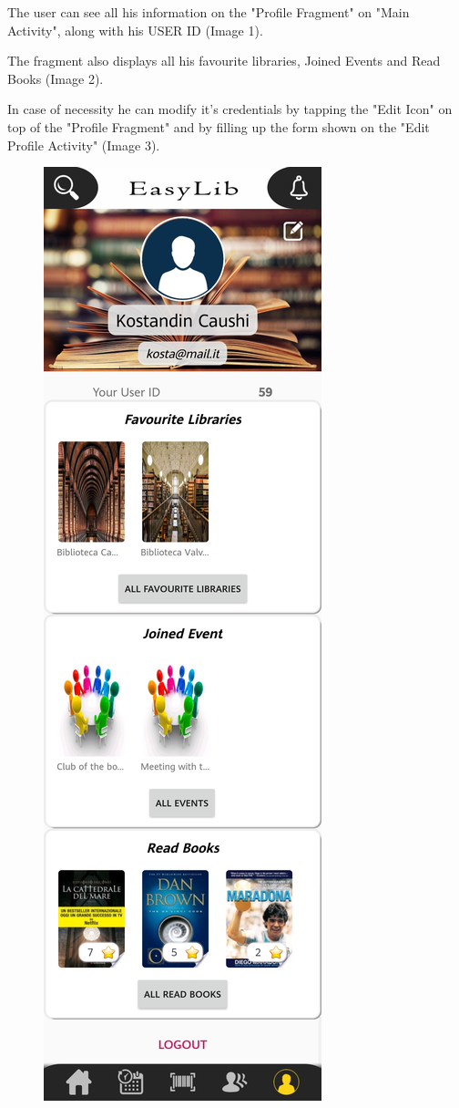\newpage
{}
The user can see all his information on the "Profile Fragment" on "Main Activity", along with his USER ID (Image 1).\par
The fragment also displays all his favourite libraries, Joined Events and Read Books (Image 2).\par
In case of necessity he can modify it's credentials by tapping the "Edit Icon" on top of the "Profile Fragment" and by filling up the form shown on the "Edit Profile Activity" (Image 3).
\vspace*{1cm}
\begin{figure}[H]
	\centering
	\includegraphics[scale=0.15]{Images/UI/Profile/1}

\end{figure}
